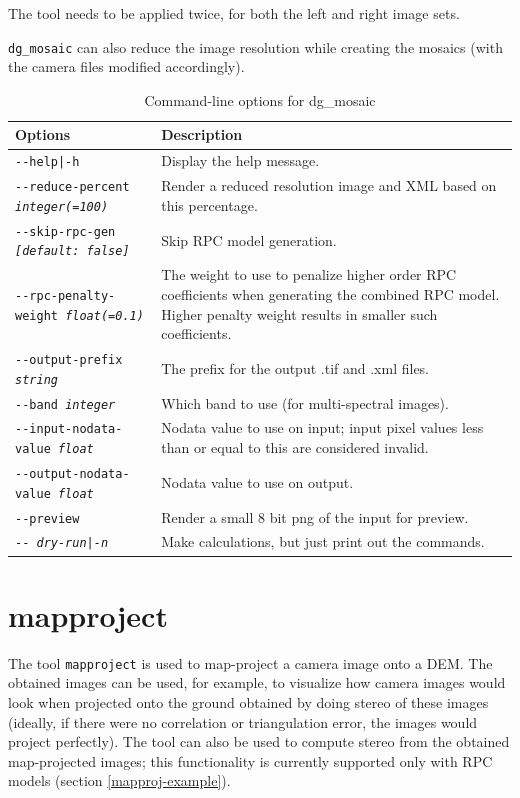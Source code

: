 The tool needs to be applied twice, for both the left and right image sets.

\texttt{dg\_mosaic} can also reduce the image resolution while creating the
mosaics (with the camera files modified accordingly).


\begin{longtable}{|l|p{10cm}|}
\caption{Command-line options for dg\_mosaic}
\label{tbl:dgmosaic}
\endfirsthead
\endhead
\endfoot
\endlastfoot
\hline
Options & Description \\ \hline \hline
\texttt{-\/-help|-h} & Display the help message.\\ \hline
\texttt{-\/-reduce-percent \textit{integer(=100)}} &
Render a reduced resolution image and XML based on this percentage. \\ \hline
\texttt{-\/-skip-rpc-gen \textit{[default: false]}} &
Skip RPC model generation.\\ \hline
\texttt{-\/-rpc-penalty-weight \textit{float(=0.1)}} &
The weight to use to penalize higher order RPC coefficients when generating the combined RPC model. Higher penalty weight results in smaller such coefficients.\\ \hline
\texttt{-\/-output-prefix \textit{string}} & The prefix for the output .tif and .xml files. \\ \hline
\texttt{-\/-band \textit{integer}} & Which band to use (for multi-spectral images). \\ \hline
\texttt{-\/-input-nodata-value \textit{float}} & Nodata value to use on input; input pixel values less than or equal to this are considered invalid. \\ \hline
\texttt{-\/-output-nodata-value \textit{float}} & Nodata value to use on output. \\ \hline

\texttt{-\/-preview } & Render a small 8 bit png of the input for preview. \\ \hline
\texttt{-\/- \textit{dry-run|-n}} & Make calculations, but just print out the commands. \\ \hline
\end{longtable}

\clearpage

\section{mapproject}
\label{mapproject}

The tool \texttt{mapproject} is used to map-project a camera image onto
a DEM. The obtained images can be used, for example, to visualize how
camera images would look when projected onto the ground obtained by
doing stereo of these images (ideally, if there were no correlation or
triangulation error, the images would project perfectly). The tool can
also be used to compute stereo from the obtained map-projected images;
this functionality is currently supported only with RPC models (section
\ref{mapproj-example}).

